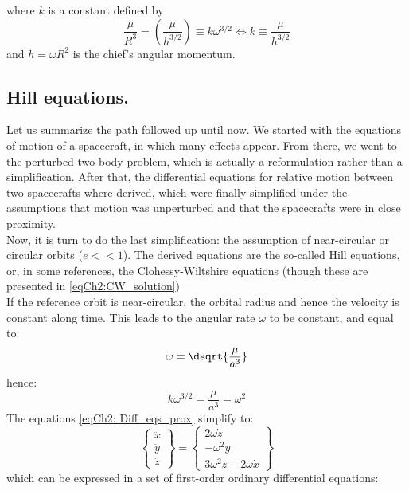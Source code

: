 	\noindent where $k$ is a constant defined by 
	\[
	\dfrac{\mu}{R^3} = \left(\dfrac{\mu }{h^{3/2}}\right) \equiv k \omega^{3/2} \Leftrightarrow k \equiv \dfrac{\mu} {h^{3/2}}
	\]
	\indent and $h = \omega R^2$ is the chief's angular momentum.
	\subsection{Hill equations.}\label{sec:Hill_eqs}
	\indent Let us summarize the path followed up until now. We started with the equations of motion of a spacecraft, in which many effects appear. From there, we went to the perturbed two-body problem, which is actually a reformulation rather than a simplification. After that, the differential equations for relative motion between two spacecrafts where derived, which were finally simplified under the assumptions that motion was unperturbed and that the spacecrafts were in close proximity. \\
	\indent Now, it is turn to do the last simplification: the assumption of near-circular or circular orbits ($e<<1$). The derived equations are the so-called Hill equations, or, in some references, the Clohessy-Wiltshire equations (though these are presented in \eqref{eqCh2:CW_solution})\\
	\indent If the reference orbit is near-circular, the orbital radius and hence the velocity is constant along time. This leads to the angular rate $\omega$ to be constant, and equal to:
	\[
	\omega = \dsqrt{\dfrac{\mu}{a^3}}
	\] 
	\noindent hence:
	\begin{equation}
	k \omega^{3/2} = \dfrac{\mu}{a^3} = \omega^2
	\label{eqCh2:omega_k}
	\end{equation}
	\indent The equations \eqref{eqCh2: Diff_eqs_prox} simplify to:\\
	\begin{equation}
	\left\{
	\begin{array}{c}
	\ddot{x}\\
	\ddot{y}\\
	\ddot{z}
	\end{array}\right\}
	= 
	\left\{
	\begin{array}{c}
	 2\omega \dot{z} \\
	-\omega^{2} y \\
	3\omega^{2} z - 2 \omega \dot{x} 
	\end{array}\right\}
	\label{eqCh2:Hill_eqs_V1}
	\end{equation}
	\noindent which can be expressed in a set of first-order ordinary differential equations:
